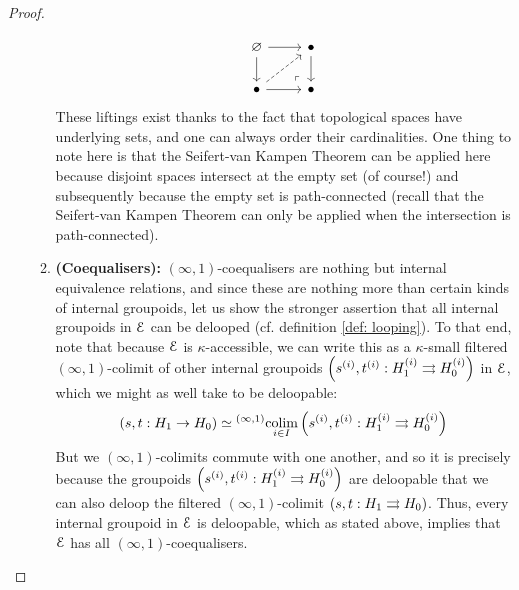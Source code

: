\begin{proof}
\begin{enumerate}
\begin{enumerate}
$$\begin{tikzcd}
                                            	\varnothing & \bullet \\
                                            	\bullet & \bullet
                                            	\arrow[from=1-1, to=2-1]
                                            	\arrow[from=2-1, to=2-2]
                                            	\arrow[from=1-1, to=1-2]
                                            	\arrow[from=1-2, to=2-2]
                                            	\arrow[dashed, from=2-1, to=1-2]
                                            	\arrow["\lrcorner"{anchor=center, pos=0.125, rotate=180}, draw=none, from=2-2, to=1-1]
                                            \end{tikzcd}
                                        $$
                                    These liftings exist thanks to the fact that topological spaces have underlying sets, and one can always order their cardinalities. One thing to note here is that the Seifert-van Kampen Theorem can be applied here because disjoint spaces intersect at the empty set (of course!) and subsequently because the empty set is path-connected (recall that the Seifert-van Kampen Theorem can only be applied when the intersection is path-connected).
                                    \item \textbf{(Coequalisers):} $(\infty, 1)$-coequalisers are nothing but internal equivalence relations, and since these are nothing more than certain kinds of internal groupoids, let us show the stronger assertion that all internal groupoids in $\mathcal{E}$ can be delooped (cf. definition \ref{def: looping}). To that end, note that because $\mathcal{E}$ is $\kappa$-accessible, we can write this as a $\kappa$-small filtered $(\infty, 1)$-colimit of other internal groupoids $\left( s^{(i)}, t^{(i)}: H_1^{(i)} \rightrightarrows H_0^{(i)} \right)$ in $\mathcal{E}$, which we might as well take to be deloopable:
                                        $$(s, t: H_1 \to H_0) \simeq {}^{(\infty, 1)}\underset{i \in I}{\operatorname{colim}} \left( s^{(i)}, t^{(i)}: H_1^{(i)} \rightrightarrows H_0^{(i)} \right)$$
                                    But we $(\infty, 1)$-colimits commute with one another, and so it is precisely because the groupoids $\left( s^{(i)}, t^{(i)}: H_1^{(i)} \rightrightarrows H_0^{(i)} \right)$ are deloopable that we can also deloop the filtered $(\infty, 1)$-colimit $(s, t: H_1 \rightrightarrows H_0)$. Thus, every internal groupoid in $\mathcal{E}$ is deloopable, which as stated above, implies that $\mathcal{E}$ has all $(\infty, 1)$-coequalisers.
                                \end{enumerate}

\end{enumerate}
\end{proof}
